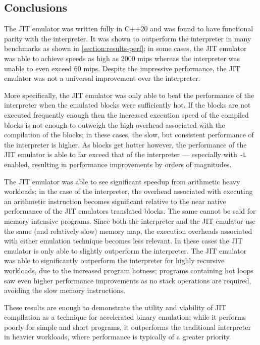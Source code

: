 \subsection{Conclusions}

The JIT emulator was written fully in C++20 and was found to have functional parity with the interpreter. It was shown to outperform the interpreter in many benchmarks as shown in \autoref{section:results-perf}; in some cases, the JIT emulator was able to achieve speeds as high as 2000 mips whereas the interpreter was unable to even exceed 60 mips. Despite the impressive performance, the JIT emulator was not a universal improvement over the interpreter.

More specifically, the JIT emulator was only able to beat the performance of the interpreter when the emulated blocks were sufficiently hot. If the blocks are not executed frequently enough then the increased execution speed of the compiled blocks is not enough to outweigh the high overhead associated with the compilation of the blocks; in these cases, the slow, but consistent performance of the interpreter is higher. As blocks get hotter however, the performance of the JIT emulator is able to far exceed that of the interpreter — especially with \texttt{-L} enabled, resulting in performance improvements by orders of magnitudes.

The JIT emulator was able to see significant speedup from arithmetic heavy workloads; in the case of the interpreter, the overhead associated with executing an arithmetic instruction becomes significant relative to the near native performance of the JIT emulators translated blocks. The same cannot be said for memory intensive programs. Since both the interpreter and the JIT emulator use the same (and relatively slow) memory map, the execution overheads associated with either emulation technique becomes less relevant. In these cases the JIT emulator is only able to slightly outperform the interpreter. The JIT emulator was able to significantly outperform the interpreter for highly recursive workloads, due to the increased program hotness; programs containing hot loops saw even higher performance improvements as no stack operations are required, avoiding the slow memory instructions.

These results are enough to demonstrate the utility and viability of JIT compilation as a technique for accelerated binary emulation; while it performs poorly for simple and short programs, it outperforms the traditional interpreter in heavier workloads, where performance is typically of a greater priority.



